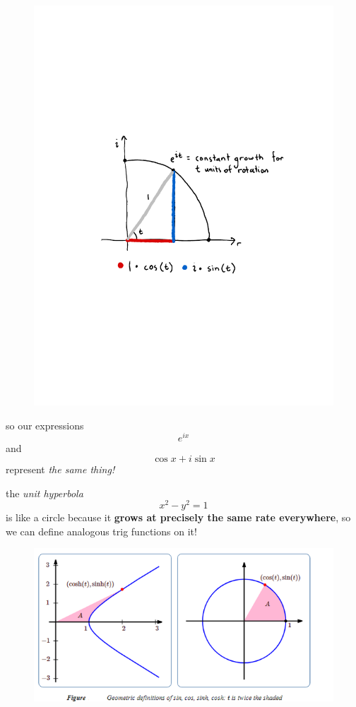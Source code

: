 \documentclass[11pt,serif,aspectratio=169]{beamer}
\begin{document}
	\begin{frame}[c]
		\begin{figure}
			\centering
			\includegraphics[height=0.9\paperheight]{constant-growth-with-e-with-trig.pdf}
		\end{figure}
	\end{frame}
	
	\begin{frame}[c]\centering
		so our expressions $$ e^{ix} $$ and $$ \cos x + i \sin x $$ represent \textit{the same thing!}
	\end{frame}
	
	\begin{frame}[c]\centering
		the \textit{unit hyperbola} $$ x^2-y^2 =1 $$ is like a circle because it \textbf{grows at precisely the same rate everywhere}, so we can define analogous trig functions on it!
	\end{frame}
	
	\begin{frame}[c]
		\begin{figure}
			\centering
			\includegraphics[height=0.9\paperheight]{hyperbola.png}
		\end{figure}
	\end{frame}
	
\end{document}
